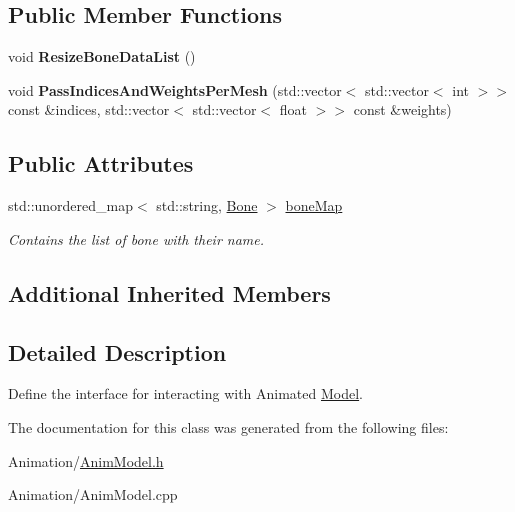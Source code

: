 \subsection*{Public Member Functions}
\begin{DoxyCompactItemize}
\item 
\mbox{\label{classAnimModel_a7d7da460f196334227d35a273069699f}} 
void {\bfseries Resize\+Bone\+Data\+List} ()
\item 
\mbox{\label{classAnimModel_a13cb24e2748e157a5a7365b3c4ec103a}} 
void {\bfseries Pass\+Indices\+And\+Weights\+Per\+Mesh} (std\+::vector$<$ std\+::vector$<$ int $>$$>$ const \&indices, std\+::vector$<$ std\+::vector$<$ float $>$$>$ const \&weights)
\end{DoxyCompactItemize}
\subsection*{Public Attributes}
\begin{DoxyCompactItemize}
\item 
\mbox{\label{classAnimModel_aceed3b69ed40893d926333b1843e837e}} 
std\+::unordered\+\_\+map$<$ std\+::string, \hyperlink{structBone}{Bone} $>$ \hyperlink{classAnimModel_aceed3b69ed40893d926333b1843e837e}{bone\+Map}
\begin{DoxyCompactList}\small\item\em Contains the list of bone with their name. \end{DoxyCompactList}\end{DoxyCompactItemize}
\subsection*{Additional Inherited Members}


\subsection{Detailed Description}
Define the interface for interacting with Animated \hyperlink{classModel}{Model}. 

The documentation for this class was generated from the following files\+:\begin{DoxyCompactItemize}
\item 
Animation/\hyperlink{AnimModel_8h}{Anim\+Model.\+h}\item 
Animation/Anim\+Model.\+cpp\end{DoxyCompactItemize}

